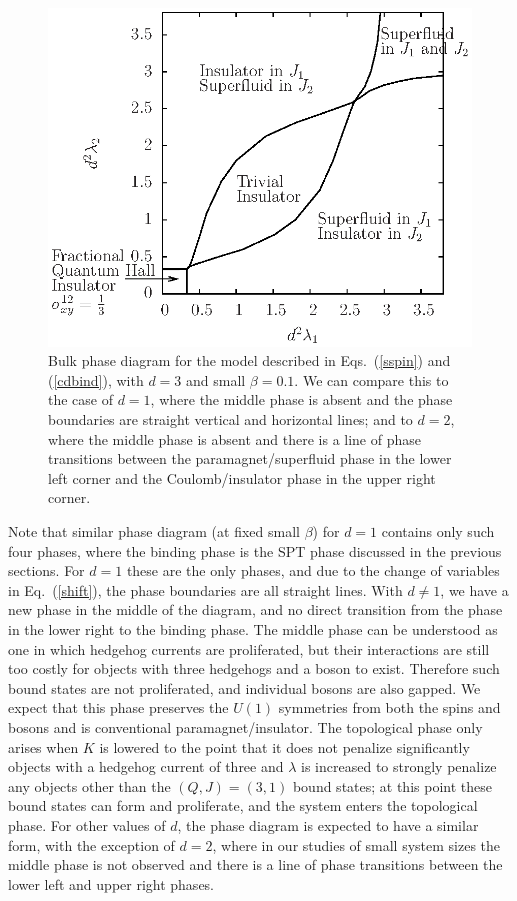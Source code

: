 \begin{figure}
\includegraphics[angle=-90,width=0.9\linewidth]{figures/fracphase.eps}
\caption{Bulk phase diagram for the model described in Eqs.~(\ref{sspin}) and (\ref{cdbind}), with $d=3$ and small $\beta=0.1$. We can compare this to the case of $d=1$, where the middle phase is absent and the phase boundaries are straight vertical and horizontal lines; and to $d=2$, where the middle phase is absent and there is a line of phase transitions between the paramagnet/superfluid phase in the lower left corner and the Coulomb/insulator phase in the upper right corner.}
\label{fracphase}
\end{figure}

Note that similar phase diagram (at fixed small $\beta$) for $d=1$ contains only such four phases, where the binding phase is the SPT phase discussed in the previous sections. For $d=1$ these are the only phases, and due to the change of variables in Eq.~(\ref{shift}), the phase boundaries are all straight lines.
With $d\neq 1$, we have a new phase in the middle of the diagram, and no direct transition from the phase in the lower right to the binding phase. The middle phase can be understood as one in which hedgehog currents are proliferated, but their interactions are still too costly for objects with three hedgehogs and a boson to exist. Therefore such bound states are not proliferated, and individual bosons are also gapped.  We expect that this phase preserves the $U(1)$ symmetries from both the spins and bosons and is conventional paramagnet/insulator. The topological phase only arises when $K$ is lowered to the point that it does not penalize significantly objects with a hedgehog current of three and $\lambda$ is increased to strongly penalize any objects other than the $(Q, J) = (3, 1)$ bound states; at this point these bound states can form and proliferate, and the system enters the topological phase. For other values of $d$, the phase diagram is expected to have a similar form, with the exception of $d=2$, where in our studies of small system sizes the middle phase is not observed and there is a line of phase transitions between the lower left and upper right phases.

